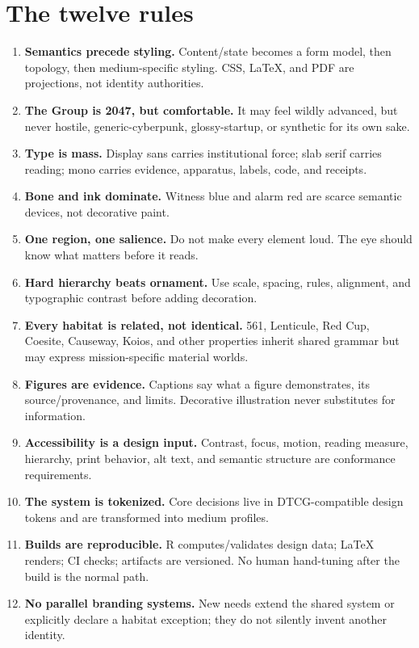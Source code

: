\documentclass[11pt,twoside,openany]{report}
\begin{document}
\chapter*{The twelve rules}
\vspace{1em}

\begin{enumerate}
  \item \textbf{Semantics precede styling.} Content/state becomes a form model, then topology, then medium-specific styling. CSS, LaTeX, and PDF are projections, not identity authorities.
  \item \textbf{The Group is 2047, but comfortable.} It may feel wildly advanced, but never hostile, generic-cyberpunk, glossy-startup, or synthetic for its own sake.
  \item \textbf{Type is mass.} Display sans carries institutional force; slab serif carries reading; mono carries evidence, apparatus, labels, code, and receipts.
  \item \textbf{Bone and ink dominate.} Witness blue and alarm red are scarce semantic devices, not decorative paint.
  \item \textbf{One region, one salience.} Do not make every element loud. The eye should know what matters before it reads.
  \item \textbf{Hard hierarchy beats ornament.} Use scale, spacing, rules, alignment, and typographic contrast before adding decoration.
  \item \textbf{Every habitat is related, not identical.} 561, Lenticule, Red Cup, Coesite, Causeway, Koios, and other properties inherit shared grammar but may express mission-specific material worlds.
  \item \textbf{Figures are evidence.} Captions say what a figure demonstrates, its source/provenance, and limits. Decorative illustration never substitutes for information.
  \item \textbf{Accessibility is a design input.} Contrast, focus, motion, reading measure, hierarchy, print behavior, alt text, and semantic structure are conformance requirements.
  \item \textbf{The system is tokenized.} Core decisions live in DTCG-compatible design tokens and are transformed into medium profiles.
  \item \textbf{Builds are reproducible.} R computes/validates design data; LaTeX renders; CI checks; artifacts are versioned. No human hand-tuning after the build is the normal path.
  \item \textbf{No parallel branding systems.} New needs extend the shared system or explicitly declare a habitat exception; they do not silently invent another identity.
\end{enumerate}
\end{document}
